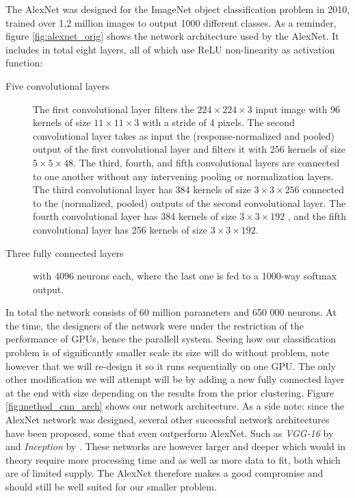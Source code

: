 The AlexNet was designed for the ImageNet object classification problem in 2010, trained over 1,2 million images to output 1000 different classes. As a reminder, figure \ref{fig:alexnet_orig} shows the network architecture used by the AlexNet. It includes in total eight layers, all of which use ReLU non-linearity as activation function:

\begin{description}

	\item[Five convolutional layers] The first convolutional layer filters the \(224 \times 224 \times 3\) input image with 96 kernels of size \(11 \times 11 \times 3\) with a stride of 4 pixels. The second convolutional layer takes as input the (response-normalized and pooled) output of the first convolutional layer and filters it with 256 kernels of size \(5 \times 5 \times 48\). The third, fourth, and fifth convolutional layers are connected to one another without any intervening pooling or normalization layers. The third convolutional layer has 384 kernels of size \(3 \times 3 \times 256\) connected to the (normalized, pooled) outputs of the second convolutional layer. The fourth convolutional layer has 384 kernels of size \(3 \times 3 \times 192\) , and the fifth convolutional layer has 256 kernels of size \(3 \times 3 \times 192\).

	\item[Three fully connected layers] with 4096 neurons each, where the last one is fed to a 1000-way softmax output.

\end{description}

In total the network consists of 60 million parameters and 650 000 neurons. At the time, the designers of the network were under the restriction of the performance of GPUs, hence the parallell system. Seeing how our classification problem is of significantly smaller scale its size will do without problem, note however that we will re-design it so it runs sequentially on one GPU. The only other modification we will attempt will be by adding a new fully connected layer at the end with size depending on the results from the prior clustering. Figure \ref{fig:method_cnn_arch} shows our network architecture. As a side note: since the AlexNet network was designed, several other successful network architectures have been proposed, some that even outperform AlexNet. Such as \emph{VGG-16} by \textcite{Arge2015} and \emph{Inception} by \textcite{Szegedy2014}. These networks are however larger and deeper which would in theory require more processing time and as well as more data to fit, both which are of limited supply. The AlexNet therefore makes a good compromise and should still be well suited for our smaller problem.

